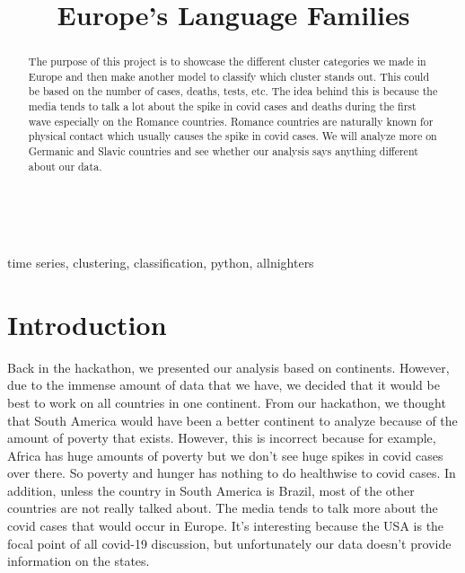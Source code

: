 \documentclass[conference]{IEEEtran}
\begin{document}
\title{Europe's Language Families}\\

\author{
\and
{}
\and
{}
}

\maketitle

\begin{abstract}
The purpose of this project is to showcase the different cluster categories we made in Europe and then make another model to classify which cluster stands out. This could be based on the number of cases, deaths, tests, etc. The idea behind this is because the media tends to talk a lot about the spike in covid cases and deaths during the first wave especially on the Romance countries. Romance countries are naturally known for physical contact which usually causes the spike in covid cases. We will analyze more on Germanic and Slavic countries and see whether our analysis says anything different about our data.
\end{abstract}

\begin{IEEEkeywords}
time series, clustering, classification, python, allnighters
\end{IEEEkeywords}

\section{Introduction}
Back in the hackathon, we presented our analysis based on continents. However, due to the immense amount of data that we have, we decided that it would be best to work on all countries in one continent. From our hackathon, we thought that South America would have been a better continent to analyze because of the amount of poverty that exists. However, this is incorrect because for example, Africa has huge amounts of poverty but we don't see huge spikes in covid cases over there. So poverty and hunger has nothing to do healthwise to covid cases. In addition, unless the country in South America is Brazil, most of the other countries are not really talked about. The media tends to talk more about the covid cases that would occur in Europe. It's interesting because the USA is the focal point of all covid-19 discussion, but unfortunately our data doesn't provide information on the states. 
\end{document}
